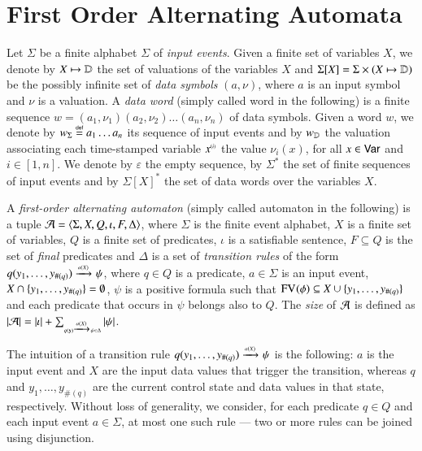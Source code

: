 \documentclass{llncs}
\begin{document}
\section{First Order Alternating Automata}

Let $\Sigma$ be a finite alphabet $\Sigma$ of \emph{input
  events}. Given a finite set of variables $X$, we denote by $X
\mapsto \mathbb{D}$ the set of valuations of the variables $X$ and
$\Sigma[X] = \Sigma \times (X \mapsto \mathbb{D})$ be the possibly infinite
set of \emph{data symbols} $(a,\nu)$, where $a$ is an input symbol and
$\nu$ is a valuation. A \emph{data word} (simply called word in the
following) is a finite sequence $w=(a_1,\nu_1)(a_2,\nu_2) \ldots
(a_n,\nu_n)$ of data symbols. Given a word $w$, we denote by
${w}_\Sigma \stackrel{\scriptscriptstyle{\mathsf{def}}}{=} a_1\ldots a_n$ its sequence of input events and by
${w}_{\mathbb{D}}$ the valuation associating each time-stamped variable
${x}^{\scriptscriptstyle{({i})}}$ the value $\nu_i(x)$, for all $x \in \mathsf{Var}$ and
$i\in[1,n]$. We denote by $\varepsilon$ the empty sequence, by
$\Sigma^*$ the set of finite sequences of input events and by
$\Sigma[X]^*$ the set of data words over the variables $X$.

A \emph{first-order alternating automaton} (simply called automaton in
the following) is a tuple $\mathcal{A} = \langle \Sigma,X,Q,\iota,F,\Delta \rangle$,
where $\Sigma$ is the finite event alphabet, $X$ is a finite set of
variables, $Q$ is a finite set of predicates, $\iota$ is a satisfiable
sentence, $F \subseteq Q$ is the set of \emph{final} predicates and
$\Delta$ is a set of \emph{transition rules} of the form
\(q(y_1,\ldots,y_{\#(q)}) \xrightarrow{{\scriptscriptstyle a(X)}}_{{\scriptstyle }} \psi\), where $q \in Q$ is a
predicate, $a \in \Sigma$ is an input event, $X \cap
\{ y_1,\ldots,y_{\#(q)} \} = \emptyset$, $\psi$ is a positive formula
such that $\mathrm{FV}_{}(\phi) \subseteq X \cup \{ y_1,\ldots,y_{\#(q)} \}$
and each predicate that occurs in $\psi$ belongs also to $Q$. The
\emph{size} of $\mathcal{A}$ is defined as ${|{\mathcal{A}}|} = {|{\iota}|} +
\sum_{\scriptscriptstyle{q(\mathbf y) \xrightarrow{{\scriptscriptstyle a(X)}}_{{\scriptstyle }} \psi \in \Delta}}
{|{\psi}|}$.

The intuition of a transition rule \(q(y_1,\ldots,y_{\#(q)})
\xrightarrow{{\scriptscriptstyle a(X)}}_{{\scriptstyle }} \psi\) is the following: $a$ is the input event and $X$
are the input data values that trigger the transition, whereas $q$ and
$y_1,\ldots,y_{\#(q)}$ are the current control state and data values
in that state, respectively. Without loss of generality, we consider,
for each predicate $q \in Q$ and each input event $a \in \Sigma$, at
most one such rule --- two or more rules can be joined using
disjunction.
\end{document}
